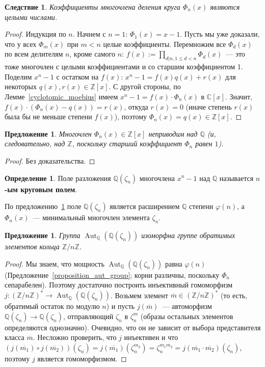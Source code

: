 \documentclass[a4paper,11pt]{scrartcl}
\theoremstyle{plain}
\newtheorem{corollary}[theorem]{Следствие}
\newtheorem{proposition}[theorem]{Предложение}
\theoremstyle{definition}
\newtheorem{definition}[theorem]{Определение}
\newcommand\dfn[1]{\textbf{#1}}
\newcommand\mb{\mathbb}
\newcommand\ph{\varphi}
\newcommand\Aut{\operatorname{Aut}}
\begin{document}
\begin{corollary}
Коэффициенты многочлена деления круга $\Phi_n(x)$ являются целыми числами.
\end{corollary}
\begin{proof}
Индукция по $n$. Начнем с $n=1$: $\Phi_1(x)=x-1$. Пусть мы уже
доказали, что у всех $\Phi_m(x)$ при $m<n$ целые
коэффициенты. Перемножим все $\Phi_d(x)$ по всем делителям $n$, кроме
самого $n$: $f(x):=\prod_{d|n, 1\leq d<n}\Phi_d(x)$~--- это тоже многочлен
с целыми коэффициентами и со старшим коэффициентом 1. Поделим $x^n-1$
с остатком на $f(x)$: $x^n-1=f(x)q(x)+r(x)$ для некоторых
$q(x),r(x)\in\mathbb Z[x]$. С другой стороны, по
Лемме~\ref{cyclotomic_moebius} имеем $x^n-1=f(x)\cdot\Phi_n(x)$ в $\mb
C[x]$. Значит, $f(x)\cdot(\Phi_n(x)-q(x))=r(x)$, откуда $r(x)=0$
(иначе степень $r(x)$ была бы не меньше степени $f(x)$), поэтому
$\Phi_n(x)=q(x)\in\mb Z[x]$.
\end{proof}

\begin{proposition}\label{cyclotomic_irreducible}
Многочлен $\Phi_n(x)\in\mb Z[x]$ неприводим над $\mb Q$ (и,
следовательно, над $\mb Z$, поскольку старший коэффициент $\Phi_n$
равен $1$).
\end{proposition}
\begin{proof}
Без доказательства.
\end{proof}

\begin{definition}
Поле разложения $\mb Q(\zeta_n)$ многочлена $x^n-1$ над $\mb Q$
называется \dfn{$n$-ым круговым полем}.
\end{definition}

По предложению~\ref{cyclotomic_irreducible} поле $\mb Q(\zeta_n)$
является расширением $\mb Q$ степени $\ph(n)$, а $\Phi_n(x)$~---
минимальный многочлен элемента $\zeta_n$.

\begin{proposition}
Группа $\Aut_{\mb Q}(\mb Q(\zeta_n))$ изоморфна группе обратимых
элементов кольца $\mb Z/n\mb Z$.
\end{proposition}
\begin{proof}
Мы знаем, что мощность $\Aut_{\mb Q}(\mb Q(\zeta_n))$ равна $\ph(n)$
(Предложение~\ref{proposition_aut_group}; корни различны, поскольку
$\Phi_n$ сепарабелен). Поэтому достаточно построить инъективный
гомоморфизм $j\colon (\mb Z/n\mb Z)^*\to\Aut_{\mb Q}(\mb
Q(\zeta_n))$. Возьмем элемент $\overline{m}\in(\mb Z/n\mb Z)^*$ (то
есть, обратимый остаток по модулю $n$) и пусть $j(\overline{m})$~---
автоморфизм $\mb Q(\zeta_n)\to \mb Q(\zeta_n)$, отправляющий $\zeta_n$
в $\zeta_n^m$ (образы остальных элементов определяются
однозначно). Очевидно, что он не зависит от выбора представителя
класса $\overline{m}$. Несложно проверить, что $j$ инъективен и что
$(j(\overline{m_1})\circ
j(\overline{m_2}))(\zeta_n)=j(\overline{m_1})(\zeta_n^{m_2})=\zeta_n^{m_1m_2}=j(\overline{m_1}\cdot\overline{m_2})(\zeta_n)$,
поэтому $j$ является гомоморфизмом.
\end{proof}
\end{document}
